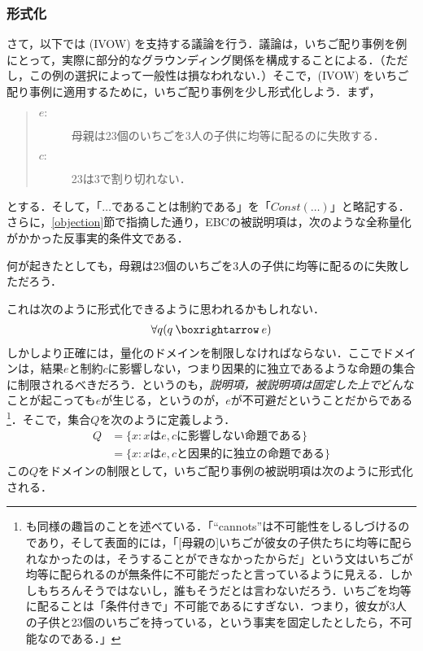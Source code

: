 \documentclass[dvipdfmx,twoside,11pt,uplatex]{jsarticle}
\theoremstyle{definition}
\begin{document}
\subsubsection{形式化}
さて，以下では (IVOW) を支持する議論を行う．議論は，いちご配り事例を例にとって，実際に部分的なグラウンディング関係を構成することによる．（ただし，この例の選択によって一般性は損なわれない．）そこで，(IVOW) をいちご配り事例に適用するために，いちご配り事例を少し形式化しよう．まず，
\begin{quote}
\begin{description}
    \item[$e:$] 母親は23個のいちごを3人の子供に均等に配るのに失敗する．
    \item[$c:$] 23は3で割り切れない．
\end{description}
\end{quote}
とする．そして，「$\ldots$であることは制約である」を「$Const(\ldots)$」と略記する．さらに，\ref{objection}節で指摘した通り，EBCの被説明項は，次のような全称量化がかかった反事実的条件文である．
\begin{exe}
    \ex 何が起きたとしても，母親は23個のいちごを3人の子供に均等に配るのに失敗しただろう．
\end{exe}
これは次のように形式化できるように思われるかもしれない．
\begin{gather*}
    \forall q ( q \necif e )
\end{gather*}
しかしより正確には，量化のドメインを制限しなければならない．ここでドメインは，結果$e$と制約$c$に影響しない，つまり因果的に独立であるような命題の集合に制限されるべきだろう．というのも，\emph{説明項，被説明項は固定した上で}どんなことが起こっても$e$が生じる，というのが，$e$が不可避だということだからである\footnote{
\citet[131--2]{skow2016reasons}も同様の趣旨のことを述べている．「``cannots''は不可能性をしるしづけるのであり，そして表面的には，「[母親の]いちごが彼女の子供たちに均等に配られなかったのは，そうすることができなかったからだ」という文はいちごが均等に配られるのが無条件に不可能だったと言っているように見える．しかしもちろんそうではないし，誰もそうだとは言わないだろう．いちごを均等に配ることは「条件付きで」不可能であるにすぎない．つまり，彼女が3人の子供と23個のいちごを持っている，という事実を固定したとしたら，不可能なのである．」
}．そこで，集合$Q$を次のように定義しよう．
\begin{align*}
    Q&=\{x: xはe,cに影響しない命題である\}\\
    &=\{x: xはe, cと因果的に独立の命題である\}
\end{align*}
この$Q$をドメインの制限として，いちご配り事例の被説明項は次のように形式化される．
\end{document}
